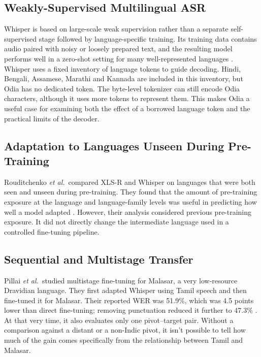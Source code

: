 \documentclass[conference]{IEEEtran}
\begin{document}
\subsection{Weakly-Supervised Multilingual ASR}

Whisper is based on large-scale weak supervision rather than a separate
self-supervised stage followed by language-specific training. Its
training data contains audio paired with noisy or loosely prepared text,
and the resulting model performs well in a zero-shot setting for many
well-represented languages \cite{radford2023whisper}. Whisper uses a
fixed inventory of language tokens to guide decoding. Hindi, Bengali,
Assamese, Marathi and Kannada are included in this inventory, but Odia
has no dedicated token. The byte-level tokenizer can still encode Odia
characters, although it uses more tokens to represent them. This makes
Odia a useful case for examining both the effect of a borrowed language
token and the practical limits of the decoder.

\subsection{Adaptation to Languages Unseen During Pre-Training}

Rouditchenko \emph{et al.}\ compared XLS-R and Whisper on languages that
were both seen and unseen during pre-training. They found that the amount
of pre-training exposure at the language and language-family levels was
useful in predicting how well a model adapted \cite{rouditchenko2023unseen}.
However, their analysis considered previous pre-training exposure. It
did not directly change the intermediate language used in a controlled
fine-tuning pipeline.

\subsection{Sequential and Multistage Transfer}

Pillai \emph{et al.}\ studied multistage fine-tuning for Malasar, a very low-resource Dravidian language. They first adapted Whisper using Tamil speech and then fine-tuned it for Malasar. Their reported WER was 51.9\%, which was 4.5 points lower than direct fine-tuning; removing punctuation reduced it further to 47.3\% \cite{pillai2026multistage}. At that very time, it also evaluates only one pivot--target pair. Without a comparison against a distant or a non-Indic pivot, it isn't possible to tell how much of the gain comes specifically from the relationship between Tamil and Malasar.
\end{document}
